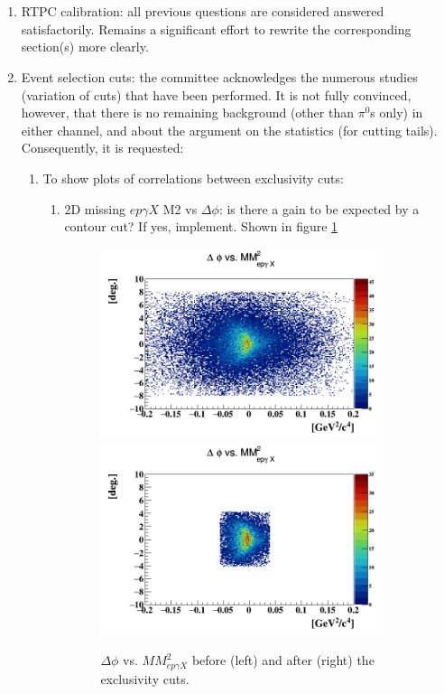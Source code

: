 \section*{}

\begin{enumerate}
\item RTPC calibration: all previous questions are considered answered 
satisfactorily. Remains a significant effort to rewrite the corresponding 
section(s) more clearly.

\item Event selection cuts: the committee acknowledges the numerous studies 
(variation of cuts) that have been performed. It is not fully convinced, 
however, that there is no remaining background (other than $\pi^{0}$s only) in 
either channel, and about the argument on the statistics (for cutting tails).  
Consequently, it is requested:
\begin{enumerate}
\item To show plots of correlations between exclusivity cuts:
\begin{enumerate}
  \item 2D missing $ep\gamma X$ M2 vs $\Delta \phi$: is there a gain to be 
     expected by a contour cut? If yes, implement. Shown in figure 
     \ref{fig:2d_delta_phi_MM2_InCoh}
    \begin{figure}[!h]
    \includegraphics[height=5.6cm]{fig/delta_phi_epgamma_M2_Mis.png}
    \includegraphics[height=5.6cm]{fig/delta_phi_epgamma_M2_Mis_with.png}
    \caption{ $\Delta \phi$ vs. $MM^{2}_{ep\gamma X}$ before (left) and 
    after (right) the exclusivity cuts.}
    \label{fig:2d_delta_phi_MM2_InCoh}
    \end{figure}                                                                  



\end{enumerate}
\end{enumerate}
\end{enumerate}
